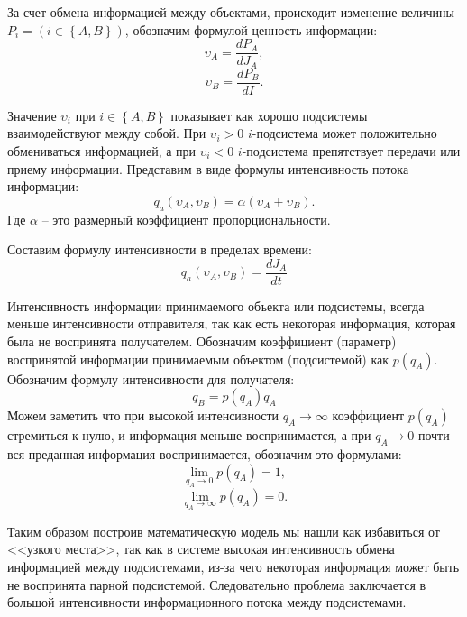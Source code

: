 За счет обмена информацией между объектами, происходит изменение величины $P_i = \left( i \in \left\{A,B \right\} \right)$, обозначим формулой ценность информации:
\begin{equation}\label{eq:cenoostinfo1}
\upsilon_A = \frac{dP_A}{dJ_A},
\end{equation}
\begin{equation}\label{eq:cenoostinfo2}
\upsilon_B = \frac{dP_B	}{dI}.
\end{equation}

Значение $\upsilon_i$ при $i \in \left\{A,B \right\}$ показывает как хорошо подсистемы взаимодействуют между собой. При $\upsilon_i > 0$ $i$-подсистема может положительно обмениваться информацией, а при $\upsilon_i < 0$ $i$-подсистема препятствует передачи или приему информации. Представим в виде формулы интенсивность потока информации:
\begin{equation}\label{eq:intensive}
q_a(\upsilon_A,\upsilon_B) = \alpha (\upsilon_A + \upsilon_B).
\end{equation}
Где $\alpha$ -- это размерный коэффициент пропорциональности.

Составим формулу интенсивности в пределах времени:
\begin{equation}\label{eq:intensiveA}
q_a(\upsilon_A,\upsilon_B) = \frac{dJ_A}{dt}
\end{equation}

Интенсивность информации принимаемого объекта или подсистемы, всегда меньше интенсивности отправителя, так как есть некоторая информация, которая была не воспринята получателем. Обозначим коэффициент (параметр) воспринятой информации принимаемым объектом (подсистемой) как $p(q_A)$. Обозначим формулу интенсивности для получателя:
\begin{equation}\label{eq:intensiveB}
q_B = p(q_A)q_A
\end{equation}
Можем заметить что при высокой интенсивности $q_A \rightarrow \infty$ коэффициент $p(q_A)$ стремиться к нулю, и информация меньше воспринимается, а при $q_A \rightarrow 0$ почти вся преданная информация воспринимается, обозначим это формулами:
\begin{equation}\label{eq:lim1}
\lim_{q_A \rightarrow 0} p(q_A) = 1,
\end{equation}
\begin{equation}\label{eq:lim0}
\lim_{q_A \rightarrow \infty} p(q_A) = 0.
\end{equation}

Таким образом построив математическую модель мы нашли как избавиться от <<узкого места>>, так как в системе высокая интенсивность обмена информацией между подсистемами, из-за чего некоторая информация может быть не воспринята парной подсистемой. Следовательно проблема заключается в большой интенсивности информационного потока между подсистемами.

